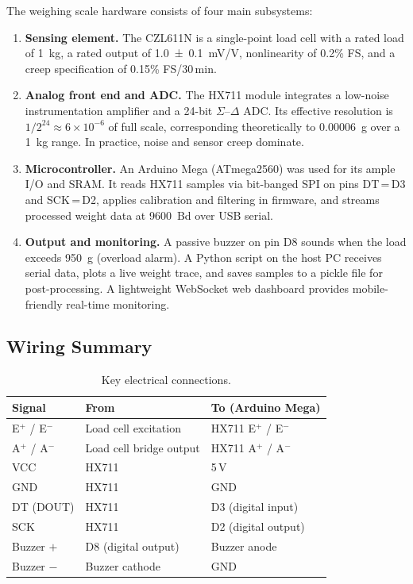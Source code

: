 \documentclass[12pt,a4paper]{article}
\begin{document}
The weighing scale hardware consists of four main subsystems:

\begin{enumerate}[leftmargin=*, label=\textbf{\arabic*.}]
  \item \textbf{Sensing element.} The CZL611N is a single-point load cell with a rated
        load of \SI{1}{kg}, a rated output of \SI{1.0 \pm 0.1}{mV/V}, nonlinearity of
        0.2\% FS, and a creep specification of 0.15\% FS/30\,min.
  \item \textbf{Analog front end and ADC.} The HX711 module integrates a low-noise
        instrumentation amplifier and a 24-bit $\Sigma$--$\Delta$ ADC. Its effective
        resolution is $1/2^{24} \approx 6\times10^{-6}$ of full scale, corresponding
        theoretically to \SI{0.00006}{g} over a \SI{1}{kg} range. In practice, noise
        and sensor creep dominate.
  \item \textbf{Microcontroller.} An Arduino Mega (ATmega2560) was used for its ample
        I/O and SRAM. It reads HX711 samples via bit-banged SPI on pins DT\,=\,D3 and
        SCK\,=\,D2, applies calibration and filtering in firmware, and streams processed
        weight data at \SI{9600}{Bd} over USB serial.
  \item \textbf{Output and monitoring.} A passive buzzer on pin D8 sounds when the load
        exceeds \SI{950}{g} (overload alarm). A Python script on the host PC receives
        serial data, plots a live weight trace, and saves samples to a pickle file for
        post-processing. A lightweight WebSocket web dashboard provides mobile-friendly
        real-time monitoring.
\end{enumerate}

\subsection{Wiring Summary}

\begin{table}[H]
\centering
\caption{Key electrical connections.}
\label{tab:wiring}
\begin{tabular}{@{}lll@{}}
\toprule
\textbf{Signal} & \textbf{From} & \textbf{To (Arduino Mega)} \\
\midrule
E$^+$ / E$^-$   & Load cell excitation & HX711 E$^+$ / E$^-$ \\
A$^+$ / A$^-$   & Load cell bridge output & HX711 A$^+$ / A$^-$ \\
VCC       & HX711 & 5\,V \\
GND       & HX711 & GND \\
DT (DOUT) & HX711 & D3 (digital input) \\
SCK       & HX711 & D2 (digital output) \\
Buzzer $+$  & D8 (digital output) & Buzzer anode \\
Buzzer $-$  & Buzzer cathode & GND \\
\bottomrule
\end{tabular}
\end{table}
\end{document}

